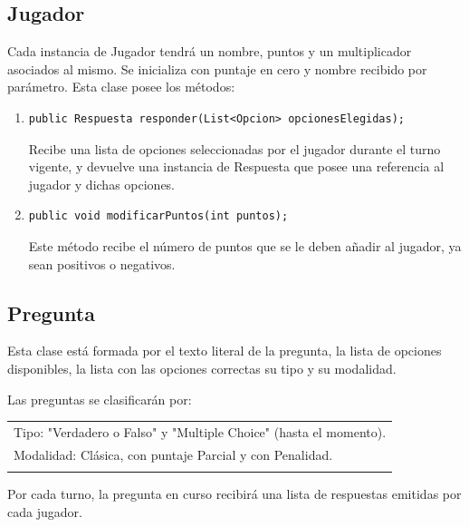 \documentclass[titlepage,a4paper]{article}
\begin{document}
\subsection{Jugador}
Cada instancia de Jugador tendrá un nombre, puntos y un multiplicador asociados al mismo. Se inicializa con puntaje en cero y nombre recibido por parámetro. Esta clase posee los métodos:
\begin{enumerate}
\item \begin{verbatim}public Respuesta responder(List<Opcion> opcionesElegidas);\end{verbatim} Recibe una lista de opciones seleccionadas por el jugador durante el turno vigente, y devuelve una instancia de Respuesta que posee una referencia al jugador y dichas opciones.
\item \begin{verbatim}public void modificarPuntos(int puntos);\end{verbatim} Este método recibe el número de puntos que se le deben añadir al jugador, ya sean positivos o negativos. 
\end{enumerate}

\subsection{Pregunta}
Esta clase está formada por el texto literal de la pregunta, la lista de opciones disponibles, la lista con las opciones correctas su tipo y su modalidad.

Las preguntas se clasificarán por:\\

\begin{tabular}{l}
Tipo: "Verdadero o Falso"$ $ y "Multiple Choice" $ $(hasta el momento).\\
Modalidad: Clásica, con puntaje Parcial y con Penalidad.\\\\
\end{tabular}

Por cada turno, la pregunta en curso recibirá una lista de respuestas emitidas por cada jugador. \\
\end{document}
